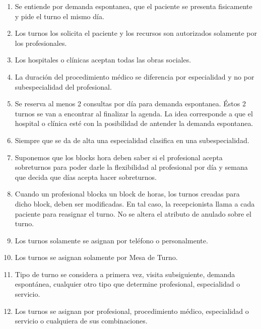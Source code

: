 \documentclass[a4paper,11pt]{article}
\begin{document}
\begin{enumerate}

    \item Se entiende por demanda espontanea, que el paciente se presenta 
    fisicamente y pide el turno el mismo día.
    
    \item Los turnos los solicita el paciente y los recursos son autorizados 
    solamente por los profesionales.
    
    \item Los hospitales o clínicas aceptan todas las obras sociales.
    
    \item La duración del procedimiento médico se diferencia por especialidad
    y no por subespecialidad del profesional.
    
    \item Se reserva al menos 2 consultas por día para demanda espontanea.
    Éstos 2 turnos se van a encontrar al finalizar la agenda. La idea corresponde
    a que el hospital o clínica esté con la posibilidad de antender la demanda
    espontanea.
    
    \item Siempre que se da de alta una especialidad clasifica en una subespecialidad.
    
    \item Suponemos que los blocks hora deben saber si el profesional acepta 
    sobreturnos para poder darle la flexibilidad al profesional por día y semana 
    que decida que días acepta hacer sobreturnos.
    
    \item Cuando un profesional blocka un block de horas, los turnos creadas 
    para dicho block, deben ser modificadas. En tal caso, la recepcionista llama
    a cada paciente para reasignar el turno. No se altera el atributo de anulado 
    sobre el turno.
    
    \item Los turnos solamente se asignan por teléfono o personalmente.
    
    \item Los turnos se asignan solamente por Mesa de Turno.
    
    \item Tipo de turno se considera a primera vez, visita subsiguiente, demanda 
    espontánea, cualquier otro 
    tipo que determine profesional, especialidad o servicio.
    
    \item Los turnos se asignan por profesional, procedimiento médico, especialidad
    o servicio o cualquiera de sus combinaciones.
    

\end{enumerate}
\end{document}
